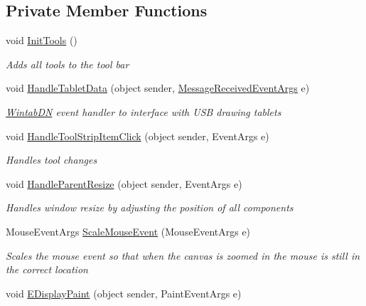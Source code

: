 \subsection*{Private Member Functions}
\begin{DoxyCompactItemize}
\item 
void \mbox{\hyperlink{class_paint___program_1_1_canvas_a7fa8707eec6c1868ec18f7151146bfae}{Init\+Tools}} ()
\begin{DoxyCompactList}\small\item\em Adds all tools to the tool bar \end{DoxyCompactList}\item 
void \mbox{\hyperlink{class_paint___program_1_1_canvas_a9cf2287e46eb0e4408c936f9d063662e}{Handle\+Tablet\+Data}} (object sender, \mbox{\hyperlink{class_wintab_d_n_1_1_message_received_event_args}{Message\+Received\+Event\+Args}} e)
\begin{DoxyCompactList}\small\item\em \mbox{\hyperlink{namespace_wintab_d_n}{Wintab\+DN}} event handler to interface with U\+SB drawing tablets \end{DoxyCompactList}\item 
void \mbox{\hyperlink{class_paint___program_1_1_canvas_a2b9769c074033d3e7b9782f058adac34}{Handle\+Tool\+Strip\+Item\+Click}} (object sender, Event\+Args e)
\begin{DoxyCompactList}\small\item\em Handles tool changes \end{DoxyCompactList}\item 
void \mbox{\hyperlink{class_paint___program_1_1_canvas_a03a3c5c5aa5410c596ca804543048cd2}{Handle\+Parent\+Resize}} (object sender, Event\+Args e)
\begin{DoxyCompactList}\small\item\em Handles window resize by adjusting the position of all components \end{DoxyCompactList}\item 
Mouse\+Event\+Args \mbox{\hyperlink{class_paint___program_1_1_canvas_ad115e2e049fe0710853b8eb6c87ba578}{Scale\+Mouse\+Event}} (Mouse\+Event\+Args e)
\begin{DoxyCompactList}\small\item\em Scales the mouse event so that when the canvas is zoomed in the mouse is still in the correct location \end{DoxyCompactList}\item 
void \mbox{\hyperlink{class_paint___program_1_1_canvas_a7dcd37fbb4f649a9a52109244cdc06c8}{E\+Display\+Paint}} (object sender, Paint\+Event\+Args e)

\end{DoxyCompactItemize}
